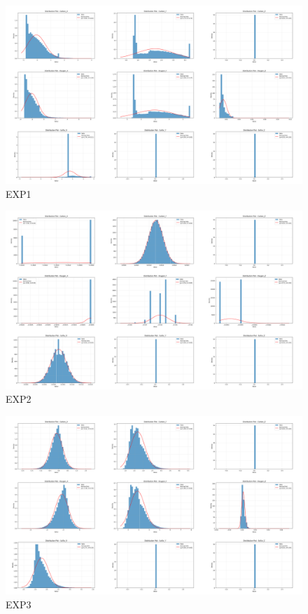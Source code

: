 \documentclass{article}
\begin{document}
\begin{figure}[H]
   \centering
   \includegraphics[width=1.2\textwidth]{EXP1.png}
   \caption{EXP1}
\end{figure}

\begin{figure}[H]
   \centering
   \includegraphics[width=1.2\textwidth]{EXP2.png}
   \caption{EXP2}
\end{figure}

\begin{figure}[H]
   \centering
   \includegraphics[width=1.2\textwidth]{EXP3.png}
   \caption{EXP3}
\end{figure}
\end{document}
